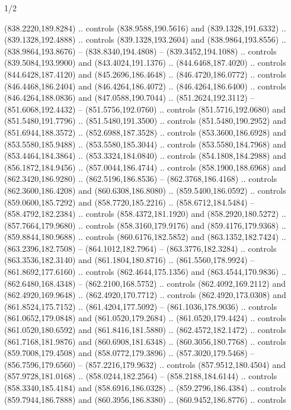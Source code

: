 \begin{flagdescription}{1/2}
\begin{scope}[xshift=0.75\flaglength,yshift=0.5\flagwidth,scale=0.00293\flagwidth]
\begin{scope}[scale=0.675,y=0.80pt, x=0.80pt,yscale=-1,xshift=-720,yshift=-240]
\begin{scope}[miter limit=4.80]
\begin{scope}[miter limit=3.00]
\begin{scope}[fill=black]
  (838.2220,189.8284) .. controls (838.9588,190.5616) and (839.1328,191.6332) ..
  (839.1328,192.4888) .. controls (839.1328,193.2604) and (838.9864,193.8556) ..
  (838.9864,193.8676) -- (838.8340,194.4808) -- (839.3452,194.1088) .. controls
  (839.5084,193.9900) and (843.4024,191.1376) .. (844.6468,187.4020) .. controls
  (844.6428,187.4120) and (845.2696,186.4648) .. (846.4720,186.0772) .. controls
  (846.4468,186.2404) and (846.4264,186.4072) .. (846.4264,186.6400) .. controls
  (846.4264,188.0836) and (847.0588,190.7044) .. (851.2624,192.3112) --
  (851.6068,192.4432) -- (851.5756,192.0760) .. controls (851.5716,192.0680) and
  (851.5480,191.7796) .. (851.5480,191.3500) .. controls (851.5480,190.2952) and
  (851.6944,188.3572) .. (852.6988,187.3528) .. controls (853.3600,186.6928) and
  (853.5580,185.9488) .. (853.5580,185.3044) .. controls (853.5580,184.7968) and
  (853.4464,184.3864) .. (853.3324,184.0840) .. controls (854.1808,184.2988) and
  (856.1872,184.9456) .. (857.0044,186.4744) .. controls (858.1900,188.6968) and
  (862.3420,186.9280) .. (862.5196,186.8536) -- (862.3768,186.4168) .. controls
  (862.3600,186.4208) and (860.6308,186.8080) .. (859.5400,186.0592) .. controls
  (859.0600,185.7292) and (858.7720,185.2216) .. (858.6712,184.5484) --
  (858.4792,182.2384) .. controls (858.4372,181.1920) and (858.2920,180.5272) ..
  (857.7664,179.9680) .. controls (858.3160,179.9176) and (859.4176,179.9368) ..
  (859.8844,180.9688) .. controls (860.6176,182.5852) and (863.1352,182.7424) ..
  (863.2396,182.7508) -- (864.1012,182.7964) -- (863.3776,182.3284) .. controls
  (863.3536,182.3140) and (861.1804,180.8716) .. (861.5560,178.9924) --
  (861.8692,177.6160) .. controls (862.4644,175.1356) and (863.4544,170.9836) ..
  (862.6480,168.4348) -- (862.2100,168.5752) .. controls (862.4092,169.2112) and
  (862.4920,169.9648) .. (862.4920,170.7712) .. controls (862.4920,173.0308) and
  (861.8524,175.7152) .. (861.4204,177.5092) -- (861.1036,178.9036) .. controls
  (861.0652,179.0848) and (861.0520,179.2684) .. (861.0520,179.4424) .. controls
  (861.0520,180.6592) and (861.8416,181.5880) .. (862.4572,182.1472) .. controls
  (861.7168,181.9876) and (860.6908,181.6348) .. (860.3056,180.7768) .. controls
  (859.7008,179.4508) and (858.0772,179.3896) .. (857.3020,179.5468) --
  (856.7596,179.6560) -- (857.2216,179.9632) .. controls (857.9512,180.4504) and
  (857.9728,181.0168) .. (858.0244,182.2564) -- (858.2188,184.6144) .. controls
  (858.3340,185.4184) and (858.6916,186.0328) .. (859.2796,186.4384) .. controls
  (859.7944,186.7888) and (860.3956,186.8380) .. (860.9452,186.8776) .. controls

\end{scope}
\end{scope}
\end{scope}
\end{scope}
\end{scope}
\end{flagdescription}
